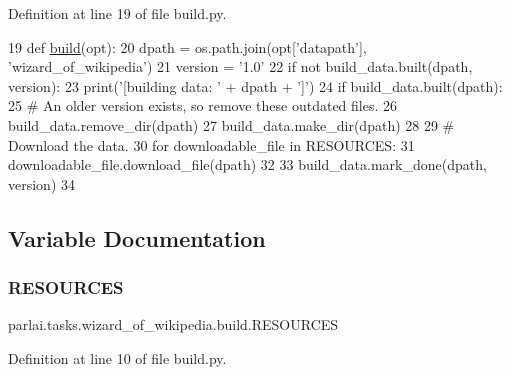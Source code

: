 Definition at line 19 of file build.\+py.


\begin{DoxyCode}
19 \textcolor{keyword}{def }\hyperlink{namespacedialog__babi__feedback_1_1build_a7a9d289f7493a5ded13c4b7f071b6184}{build}(opt):
20     dpath = os.path.join(opt[\textcolor{stringliteral}{'datapath'}], \textcolor{stringliteral}{'wizard\_of\_wikipedia'})
21     version = \textcolor{stringliteral}{'1.0'}
22     \textcolor{keywordflow}{if} \textcolor{keywordflow}{not} build\_data.built(dpath, version):
23         print(\textcolor{stringliteral}{'[building data: '} + dpath + \textcolor{stringliteral}{']'})
24         \textcolor{keywordflow}{if} build\_data.built(dpath):
25             \textcolor{comment}{# An older version exists, so remove these outdated files.}
26             build\_data.remove\_dir(dpath)
27         build\_data.make\_dir(dpath)
28 
29         \textcolor{comment}{# Download the data.}
30         \textcolor{keywordflow}{for} downloadable\_file \textcolor{keywordflow}{in} RESOURCES:
31             downloadable\_file.download\_file(dpath)
32 
33         build\_data.mark\_done(dpath, version)
34 \end{DoxyCode}


\subsection{Variable Documentation}
\mbox{\label{namespaceparlai_1_1tasks_1_1wizard__of__wikipedia_1_1build_ad3388ca9cad3fd5e54487c840676dddf}} 
\subsubsection{\texorpdfstring{R\+E\+S\+O\+U\+R\+C\+ES}{RESOURCES}}
{\footnotesize\ttfamily parlai.\+tasks.\+wizard\+\_\+of\+\_\+wikipedia.\+build.\+R\+E\+S\+O\+U\+R\+C\+ES}



Definition at line 10 of file build.\+py.

